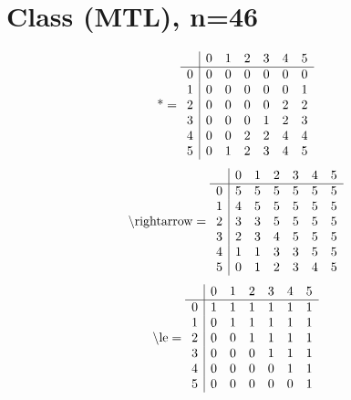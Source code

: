 \documentclass[11pt]{article}
\begin{document}
\section{Class (MTL), n=46}
\[\text{*} = 
\begin{array}{r | r r r r r r}
 & 0 & 1 & 2 & 3 & 4 & 5 \\ \hline
0 & 0 & 0 & 0 & 0 & 0 & 0 \\
1 & 0 & 0 & 0 & 0 & 0 & 1 \\
2 & 0 & 0 & 0 & 0 & 2 & 2 \\
3 & 0 & 0 & 0 & 1 & 2 & 3 \\
4 & 0 & 0 & 2 & 2 & 4 & 4 \\
5 & 0 & 1 & 2 & 3 & 4 & 5 \\
\end{array}
\]
\[\text{\textbackslash rightarrow} = 
\begin{array}{r | r r r r r r}
 & 0 & 1 & 2 & 3 & 4 & 5 \\ \hline
0 & 5 & 5 & 5 & 5 & 5 & 5 \\
1 & 4 & 5 & 5 & 5 & 5 & 5 \\
2 & 3 & 3 & 5 & 5 & 5 & 5 \\
3 & 2 & 3 & 4 & 5 & 5 & 5 \\
4 & 1 & 1 & 3 & 3 & 5 & 5 \\
5 & 0 & 1 & 2 & 3 & 4 & 5 \\
\end{array}
\]
\[\text{\textbackslash le} = 
\begin{array}{r | r r r r r r}
 & 0 & 1 & 2 & 3 & 4 & 5 \\ \hline
0 & 1 & 1 & 1 & 1 & 1 & 1 \\
1 & 0 & 1 & 1 & 1 & 1 & 1 \\
2 & 0 & 0 & 1 & 1 & 1 & 1 \\
3 & 0 & 0 & 0 & 1 & 1 & 1 \\
4 & 0 & 0 & 0 & 0 & 1 & 1 \\
5 & 0 & 0 & 0 & 0 & 0 & 1 \\
\end{array}
\]
\end{document}
